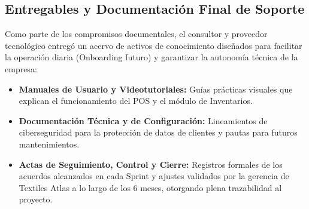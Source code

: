 \subsection{Entregables y Documentación Final de Soporte}
Como parte de los compromisos documentales, el consultor y proveedor tecnológico entregó un acervo de activos de conocimiento diseñados para facilitar la operación diaria (Onboarding futuro) y garantizar la autonomía técnica de la empresa:
\begin{itemize}
    \item \textbf{Manuales de Usuario y Videotutoriales:} Guías prácticas visuales que explican el funcionamiento del POS y el módulo de Inventarios.
    \item \textbf{Documentación Técnica y de Configuración:} Lineamientos de ciberseguridad para la protección de datos de clientes y pautas para futuros mantenimientos.
    \item \textbf{Actas de Seguimiento, Control y Cierre:} Registros formales de los acuerdos alcanzados en cada Sprint y ajustes validados por la gerencia de Textiles Atlas a lo largo de los 6 meses, otorgando plena trazabilidad al proyecto.
\end{itemize}
